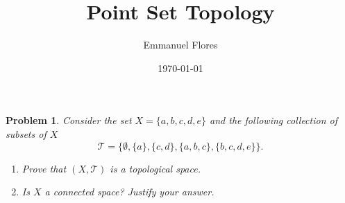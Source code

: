 \documentclass[11pt]{article}
\title{Point Set Topology}
\author{Emmanuel Flores}
\date{\today}
\newtheorem{problem}{Problem}
\begin{document}
\maketitle
\begin{problem}
Consider the set $X = \{a,b,c,d,e\}$ and the following collection of subsets of $X$
\begin{displaymath}
  \mathcal{T}=\{\emptyset,\{a\}, \{c,d\}, \{a,b,c\}, \{b,c,d,e\} \}.
\end{displaymath}
\begin{enumerate}
	\item Prove that $( X, \mathcal{T})$ is a topological space.
	\item Is $X$ a connected space? Justify your answer.
\end{enumerate}
\end{problem}
\end{document}
